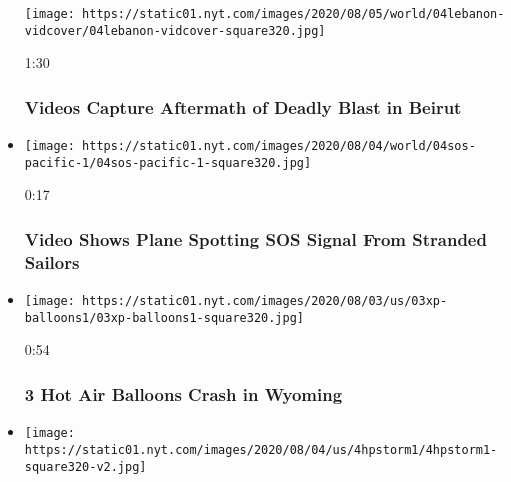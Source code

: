 \begin{itemize}
  \texttt{[image: https://static01.nyt.com/images/2020/08/05/world/04lebanon-vidcover/04lebanon-vidcover-square320.jpg]}

  1:30

  \hypertarget{videos-capture-aftermath-of-deadly-blast-in-beirut}{%
  \subsubsection{Videos Capture Aftermath of Deadly Blast in
  Beirut}\label{videos-capture-aftermath-of-deadly-blast-in-beirut}}
\item
  \href{https://www.nytimes.com/video/world/100000007271927/pacific-island-rescue-video.html?action=click\&module=video-series-bar\&region=header\&pgtype=Article\&playlistId=video/latest-video}{}

  \texttt{[image: https://static01.nyt.com/images/2020/08/04/world/04sos-pacific-1/04sos-pacific-1-square320.jpg]}

  0:17

  \hypertarget{video-shows-plane-spotting-sos-signal-from-stranded-sailors}{%
  \subsubsection{Video Shows Plane Spotting SOS Signal From Stranded
  Sailors}\label{video-shows-plane-spotting-sos-signal-from-stranded-sailors}}
\item
  \href{https://www.nytimes.com/video/us/100000007271780/wyoming-hot-air-balloon-crash.html?action=click\&module=video-series-bar\&region=header\&pgtype=Article\&playlistId=video/latest-video}{}

  \texttt{[image: https://static01.nyt.com/images/2020/08/03/us/03xp-balloons1/03xp-balloons1-square320.jpg]}

  0:54

  \hypertarget{3-hot-air-balloons-crash-in-wyoming}{%
  \subsubsection{3 Hot Air Balloons Crash in
  Wyoming}\label{3-hot-air-balloons-crash-in-wyoming}}
\item
  \href{https://www.nytimes.com/video/us/100000007271735/tropical-storm-isaias-carolinas.html?action=click\&module=video-series-bar\&region=header\&pgtype=Article\&playlistId=video/latest-video}{}

  \texttt{[image: https://static01.nyt.com/images/2020/08/04/us/4hpstorm1/4hpstorm1-square320-v2.jpg]}


\end{itemize}
